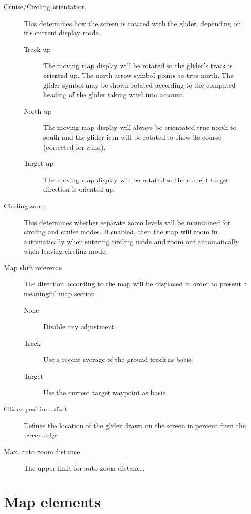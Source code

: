 \begin{description}
\item[Cruise/Circling orientation]  \label{conf:orientation} This determines how
the screen is rotated with the glider, depending on it's current display mode.
\begin{description}
\item[Track up]  The moving map display will be rotated so the glider's track
 is oriented up. The north arrow symbol points to true north. The glider symbol 
 may be shown rotated according to the computed heading of the glider taking wind into account.
\item[North up]  The moving map display will always be orientated true north to
 south and the glider icon will be rotated to show its course (corrected for
 wind).
\item[Target up]  The moving map display will be rotated so the current target
 direction is oriented up.
\end{description}

\item[Circling zoom]  \label{conf:circlingzoom} This determines whether separate
zoom levels will be maintained for circling and cruise modes.  If enabled, then the 
map will zoom in automatically when entering circling mode and zoom out
automatically when leaving circling mode.

\item[Map shift reference]  The direction according to the map will be displaced 
 in order to present a meaningful map section.
\begin{description}
  \item[None]  Disable any adjustment.
  \item[Track]  Use a recent average of the ground track as basis.
  \item[Target]  Use the current target waypoint as basis.
\end{description}

\item[Glider position offset]  \label{conf:gliderposition} Defines the location of the 
 glider drawn on the screen in percent from the screen edge.

\item[Max. auto zoom distance]  The upper limit for auto zoom distance.
\end{description}


\clearpage
\section{Map elements}\label{sec:map-elements}


